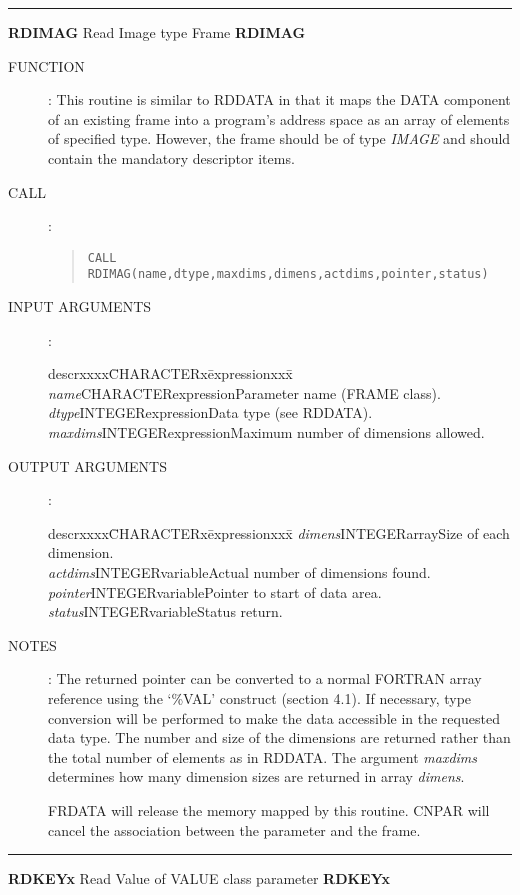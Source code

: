 \rule{\textwidth}{0.3mm}
{\Large {\bf RDIMAG} \hfill Read Image type Frame \hfill {\bf RDIMAG}}
\begin{description}
\item [FUNCTION]:
This routine is similar to RDDATA in that it maps the DATA component of an
existing frame into a program's address space as an array of elements of
specified type.
However, the frame should be of type {\em IMAGE} and should contain the mandatory
descriptor items.
\item [CALL]:
\begin{quote}
{\tt CALL RDIMAG(name,dtype,maxdims,dimens,actdims,pointer,status)}
\end{quote}
\item [INPUT ARGUMENTS]:
\begin{tabbing}
descrxxxx\=CHARACTERx\=expressionxxx\=\kill
{\em name}\>CHARACTER\>expression\>Parameter name (FRAME class).\\
{\em dtype}\>INTEGER\>expression\>Data type (see RDDATA).\\
{\em maxdims}\>INTEGER\>expression\>Maximum number of dimensions allowed.
\end{tabbing}
\item [OUTPUT ARGUMENTS]:
\begin{tabbing}
descrxxxx\=CHARACTERx\=expressionxxx\=\kill
{\em dimens}\>INTEGER\>array\>Size of each dimension.\\
{\em actdims}\>INTEGER\>variable\>Actual number of dimensions found.\\
{\em pointer}\>INTEGER\>variable\>Pointer to start of data area.\\
{\em status}\>INTEGER\>variable\>Status return.
\end{tabbing}
\item [NOTES]:
The returned pointer can be converted to a normal FORTRAN array reference using
the `\%VAL' construct (section 4.1).
If necessary, type conversion will be performed to make the data accessible in
the requested data type.
The number and size of the dimensions are returned rather than the total number
of elements as in RDDATA.
The argument {\em maxdims} determines how many dimension sizes are returned in
array {\em dimens}.

FRDATA will release the memory mapped by  this routine.
CNPAR will cancel the association between the parameter and the frame.
\end{description}
\rule{\textwidth}{0.3mm}
{\Large {\bf RDKEYx} \hfill Read Value of VALUE class parameter \hfill {\bf RDKEYx}}

